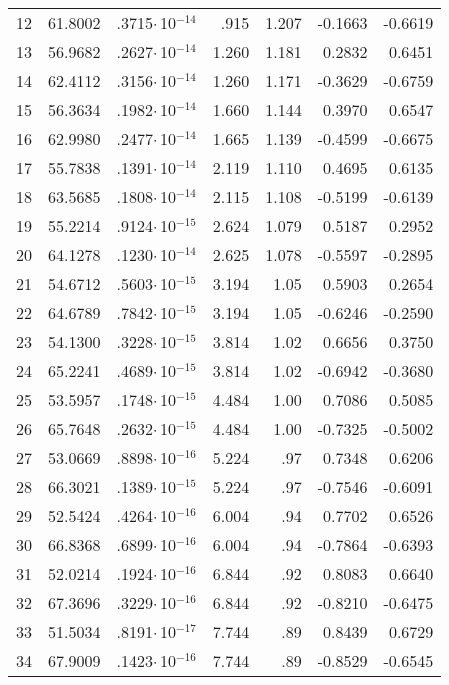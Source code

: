 \begin{longtable}{lrrrrrr}
12 & 61.8002 & .3715$\cdot$\,10$^{-14}$ & .915 & 1.207 & -0.1663 & -0.6619 \\
13 & 56.9682 & .2627$\cdot$\,10$^{-14}$ & 1.260 & 1.181 & 0.2832 & 0.6451 \\
14 & 62.4112 & .3156$\cdot$\,10$^{-14}$ & 1.260 & 1.171 & -0.3629 & -0.6759 \\
15 & 56.3634 & .1982$\cdot$\,10$^{-14}$ & 1.660 & 1.144 & 0.3970 &  0.6547 \\
16 & 62.9980 & .2477$\cdot$\,10$^{-14}$ & 1.665 & 1.139 & -0.4599 & -0.6675 \\
17 & 55.7838 & .1391$\cdot$\,10$^{-14}$ & 2.119 & 1.110 & 0.4695 & 0.6135 \\
18 & 63.5685 & .1808$\cdot$\,10$^{-14}$ & 2.115 & 1.108 & -0.5199 & -0.6139 \\
19 & 55.2214 & .9124$\cdot$\,10$^{-15}$ & 2.624 & 1.079 & 0.5187 & 0.2952 \\
20 & 64.1278 & .1230$\cdot$\,10$^{-14}$ & 2.625 & 1.078 & -0.5597 & -0.2895 \\
21 & 54.6712 & .5603$\cdot$\,10$^{-15}$ & 3.194 & 1.05 & 0.5903 & 0.2654 \\
22 & 64.6789 & .7842$\cdot$\,10$^{-15}$ & 3.194 & 1.05 & -0.6246 & -0.2590 \\
23 & 54.1300 & .3228$\cdot$\,10$^{-15}$ & 3.814 & 1.02 & 0.6656 & 0.3750 \\
24 & 65.2241 & .4689$\cdot$\,10$^{-15}$ & 3.814 & 1.02 & -0.6942 & -0.3680 \\
25 & 53.5957 & .1748$\cdot$\,10$^{-15}$ & 4.484 & 1.00 & 0.7086 & 0.5085 \\
26 & 65.7648 & .2632$\cdot$\,10$^{-15}$ & 4.484 & 1.00 & -0.7325 & -0.5002 \\
27 & 53.0669 & .8898$\cdot$\,10$^{-16}$ & 5.224 & .97 & 0.7348 & 0.6206 \\
28 & 66.3021 & .1389$\cdot$\,10$^{-15}$ & 5.224 & .97 & -0.7546 & -0.6091 \\
29 & 52.5424 & .4264$\cdot$\,10$^{-16}$ & 6.004 & .94 & 0.7702 & 0.6526 \\
30 & 66.8368 & .6899$\cdot$\,10$^{-16}$ & 6.004 & .94 & -0.7864 & -0.6393 \\
31 & 52.0214 & .1924$\cdot$\,10$^{-16}$ & 6.844 & .92 & 0.8083 & 0.6640 \\
32 & 67.3696 & .3229$\cdot$\,10$^{-16}$ & 6.844 & .92 & -0.8210 & -0.6475 \\
33 & 51.5034 & .8191$\cdot$\,10$^{-17}$ & 7.744 & .89 & 0.8439 & 0.6729 \\
34 & 67.9009 & .1423$\cdot$\,10$^{-16}$ & 7.744 & .89 & -0.8529 & -0.6545 \\

\end{longtable}
